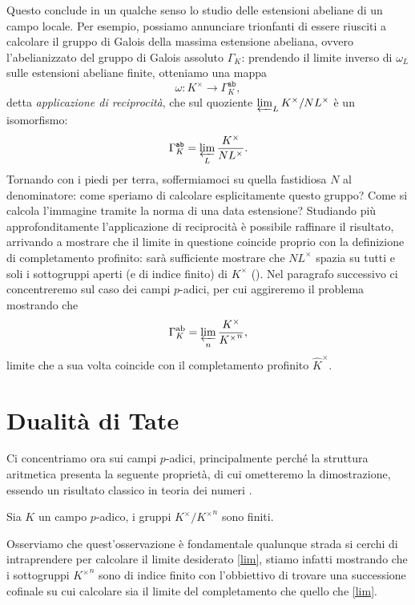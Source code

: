 Questo conclude in un qualche senso lo studio delle estensioni abeliane di un campo locale. Per esempio, possiamo annunciare trionfanti di essere riusciti a calcolare il gruppo di Galois della massima estensione abeliana, ovvero l'abelianizzato del gruppo di Galois assoluto $ \Gamma_K $: prendendo il limite inverso di $ \omega_L $ sulle estensioni abeliane finite, otteniamo una mappa
\[ \omega\colon K^\times \to \Gamma_K^{\texttt{ab}}, \]
detta \emph{applicazione di reciprocità}, che sul quoziente $ \varprojlim_L K^\times / NL^\times  $ è un isomorfismo:
\begin{equation}\label{lim}
	\Gamma_K^{\texttt{ab}} = \varprojlim_L \frac{K^\times}{NL^\times}.
\end{equation}
Tornando con i piedi per terra, soffermiamoci su quella fastidiosa $ N $ al denominatore: come speriamo di calcolare esplicitamente questo gruppo? Come si calcola l'immagine tramite la norma di una data estensione? Studiando più approfonditamente l'applicazione di reciprocità è possibile raffinare il risultato, arrivando a mostrare che il limite in questione coincide proprio con la definizione di completamento profinito: sarà sufficiente mostrare che $ NL^\times $ spazia su tutti e soli i sottogruppi aperti (e di indice finito) di $ K^\times $ (\cite[XIV.\S 6.1]{SerreFields}). Nel paragrafo successivo ci concentreremo sul caso dei campi $ p $-adici, per cui aggireremo il problema mostrando che
\[ \Gamma^\text{ab}_K = \varprojlim_n \frac{K^\times}{{K^\times}^n}, \]
limite che a sua volta coincide con il completamento profinito $ \hat{K}^\times $.

\section{Dualità di Tate}
Ci concentriamo ora sui campi $ p $-adici, principalmente perché la struttura aritmetica presenta la seguente proprietà, di cui ometteremo la dimostrazione, essendo un risultato classico in teoria dei numeri \cite[proposizione 4.11]{Harari}.

\begin{proposition}
	Sia $ K $ un campo $ p $-adico, i gruppi $ K^\times / {K^\times}^n $ sono finiti.
\end{proposition}

Osserviamo che quest'osservazione è fondamentale qualunque strada si cerchi di intraprendere per calcolare il limite desiderato \eqref{lim}, stiamo infatti mostrando che i sottogruppi $ {K^\times}^n $ sono di indice finito con l'obbiettivo di trovare una successione cofinale su cui calcolare sia il limite del completamento che quello che \eqref{lim}.

